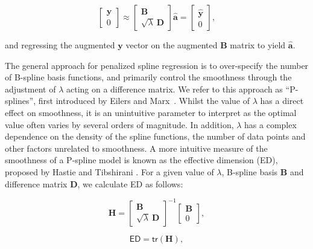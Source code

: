 \documentclass[num-refs]{wiley-article}
\begin{document}
\begin{equation}
  \begin{bmatrix}
    \mathbf{y} \\ 0
  \end{bmatrix}
  \approx
  \begin{bmatrix}
    \mathbf{B} \\ \sqrt{\lambda} \ \mathbf{D}
  \end{bmatrix} \hat{\mathbf{a}} =
  \begin{bmatrix}
    \hat{\mathbf{y}} \\ 0
  \end{bmatrix},
  \label{p-spline_eq}
\end{equation}

and regressing the augmented $\mathbf{y}$ vector on the augmented $\mathbf{B}$ matrix to yield $\hat{\mathbf{a}}$.

The general approach for penalized spline regression is to over-specify the number of B-spline basis functions, and primarily control the smoothness through the adjustment of $\lambda$ acting on a difference matrix. We refer to this approach as ``P-splines'', first introduced by Eilers and Marx~\cite{Eilers1996}. Whilst the value of $\lambda$ has a direct effect on smoothness, it is an unintuitive parameter to interpret as the optimal value often varies by several orders of magnitude. In addition, $\lambda$ has a complex dependence on the density of the spline functions, the number of data points and other factors unrelated to smoothness. A more intuitive measure of the smoothness of a P-spline model is known as the effective dimension (ED), proposed by Hastie and Tibshirani \cite{Hastie1990}. For a given value of $\lambda$, B-spline basis $\mathbf{B}$ and difference matrix $\mathbf{D}$, we calculate ED as follows:

\begin{equation}
  \mathbf{H} =
  \begin{bmatrix}
    \mathbf{B} \\ \sqrt{\lambda}\ \mathbf{D}
  \end{bmatrix}^{-1}
  \begin{bmatrix}
    \mathbf{B} \\ 0
  \end{bmatrix},
\end{equation}

\begin{equation}
  \textsf{ED} = \textsf{tr}(\mathbf{H}),
\end{equation}
\end{document}
